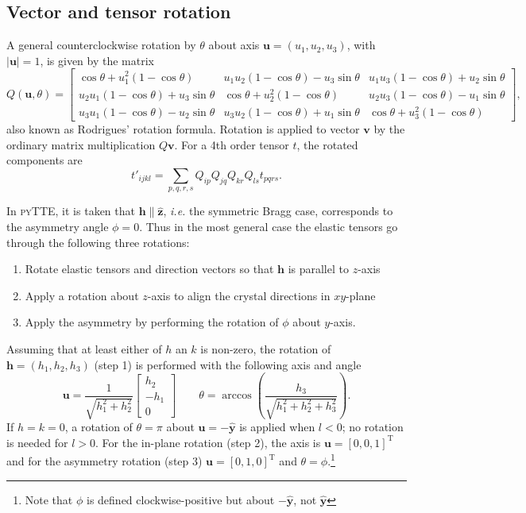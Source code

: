 \documentclass[11pt,a4paper]{article}
\begin{document}
\subsection{Vector and tensor rotation}
A general counterclockwise rotation by $\theta$ about axis $\mathbf{u} = (u_1, u_2, u_3)$, with $|\mathbf{u}| = 1$, is given by the matrix
\begin{equation}
Q(\mathbf{u},\theta) = \left[\begin{matrix}
\cos \theta + u_1^2 (1 - \cos \theta) & u_1 u_2 (1 -\cos \theta) - u_3 \sin \theta &  u_1 u_3 (1 -\cos \theta) + u_2 \sin \theta \\
u_2 u_1 (1 -\cos \theta) + u_3 \sin \theta & \cos \theta + u_2^2 (1 - \cos \theta) & u_2 u_3 (1 -\cos \theta) - u_1 \sin \theta \\
u_3 u_1 (1 -\cos \theta) - u_2 \sin \theta &  u_3 u_2 (1 -\cos \theta) + u_1 \sin \theta & \cos \theta + u_3^2 (1 - \cos \theta)
\end{matrix} \right],
\end{equation}
also known as Rodrigues' rotation formula. Rotation is applied to vector $\mathbf{v}$ by the ordinary matrix multiplication $Q\mathbf{v}$. For a 4th order tensor $t$, the rotated components are 
\begin{equation}
t'_{ijkl} = \sum_{p,q,r,s} Q_{ip}Q_{jq}Q_{kr}Q_{ls} t_{pqrs}.
\end{equation}

In \textsc{pyTTE}, it is taken that $\mathbf{h} \parallel \hat{\mathbf{z}}$, \emph{i.e.} the symmetric Bragg case, corresponds to the asymmetry angle $\phi=0$. Thus in the most general case the elastic tensors go through the following three rotations:
\begin{enumerate}
\item Rotate elastic tensors and direction vectors so that $\mathbf{h}$ is parallel to $z$-axis
\item Apply a rotation about $z$-axis to align the crystal directions in $xy$-plane
\item Apply the asymmetry by performing the rotation of $\phi$ about $y$-axis.
\end{enumerate}
Assuming that at least either of $h$ an $k$ is non-zero, the rotation of $\mathbf{h}= (h_1,h_2,h_3)$ (step 1) is performed with the following axis and angle
\begin{equation}
\mathbf{u} = \frac{1}{\sqrt{h_1^2 + h_2^2}} \left[\begin{matrix} h_2 \\ -h_1 \\ 0 \end{matrix}\right] \qquad
\theta = \arccos \left( \frac{h_3}{\sqrt{h_1^2 + h_2^2 + h_3^2}} \right).
\end{equation}
If $h=k=0$, a rotation of $\theta = \pi$ about $\mathbf{u} = -\hat{\mathbf{y}}$ is applied when $l<0$; no rotation is needed for $l>0$. For the in-plane rotation (step 2), the axis is $\mathbf{u} = [0,0,1]^{\mathrm{T}}$ and for the asymmetry rotation (step 3) $\mathbf{u} = [0,1,0]^{\mathrm{T}}$ and $\theta = \phi$.\footnote{Note that $\phi$ is defined clockwise-positive but about $-\hat{\mathbf{y}}$, not $\hat{\mathbf{y}}$}




\end{document}

